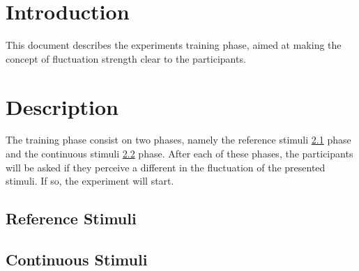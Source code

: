\documentclass[a4paper]{article}
\begin{document}

\section{Introduction} %
\label{sec:introduction}

This document describes the experiment\textquotesingle s training phase, aimed
at making the concept of fluctuation strength clear to the participants.


\section{Description} %
\label{sec:description}

The training phase consist on two phases, namely the reference stimuli
\ref{sub:reference_stimuli} phase and the continuous stimuli
\ref{sub:continuous_stimuli} phase. After each of these phases, the participants
will be asked if they perceive a different in the fluctuation of the presented
stimuli. If so, the experiment will start.

\subsection{Reference Stimuli} %
\label{sub:reference_stimuli}


\subsection{Continuous Stimuli} %
\label{sub:continuous_stimuli}


\end{document}
